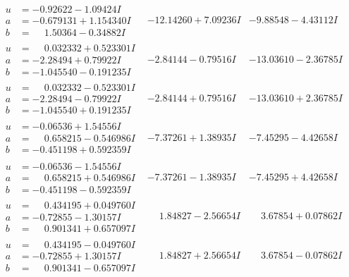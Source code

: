\documentclass[1p]{elsarticle_modified}
\theoremstyle{definition}
\begin{document}
$$\begin{array}{c|c|c}
\begin{aligned}
u &= -0.92622 - 1.09424 I \\
a &= -0.679131 + 1.154340 I \\
b &= \phantom{-}1.50364 - 0.34882 I\end{aligned}
 & -12.14260 + 7.09236 I & -9.88548 - 4.43112 I \\ \hline\begin{aligned}
u &= \phantom{-}0.032332 + 0.523301 I \\
a &= -2.28494 + 0.79922 I \\
b &= -1.045540 - 0.191235 I\end{aligned}
 & -2.84144 - 0.79516 I & -13.03610 - 2.36785 I \\ \hline\begin{aligned}
u &= \phantom{-}0.032332 - 0.523301 I \\
a &= -2.28494 - 0.79922 I \\
b &= -1.045540 + 0.191235 I\end{aligned}
 & -2.84144 + 0.79516 I & -13.03610 + 2.36785 I \\ \hline\begin{aligned}
u &= -0.06536 + 1.54556 I \\
a &= \phantom{-}0.658215 - 0.546986 I \\
b &= -0.451198 + 0.592359 I\end{aligned}
 & -7.37261 + 1.38935 I & -7.45295 - 4.42658 I \\ \hline\begin{aligned}
u &= -0.06536 - 1.54556 I \\
a &= \phantom{-}0.658215 + 0.546986 I \\
b &= -0.451198 - 0.592359 I\end{aligned}
 & -7.37261 - 1.38935 I & -7.45295 + 4.42658 I \\ \hline\begin{aligned}
u &= \phantom{-}0.434195 + 0.049760 I \\
a &= -0.72855 - 1.30157 I \\
b &= \phantom{-}0.901341 + 0.657097 I\end{aligned}
 & \phantom{-}1.84827 - 2.56654 I & \phantom{-}3.67854 + 0.07862 I \\ \hline\begin{aligned}
u &= \phantom{-}0.434195 - 0.049760 I \\
a &= -0.72855 + 1.30157 I \\
b &= \phantom{-}0.901341 - 0.657097 I\end{aligned}
 & \phantom{-}1.84827 + 2.56654 I & \phantom{-}3.67854 - 0.07862 I \\ \hline\begin{aligned}

\end{aligned}
\end{array}$$
\end{document}

